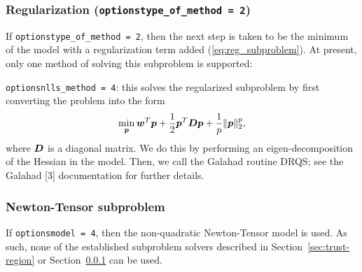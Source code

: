 \subsubsection{Regularization ({\tt options\ct type\_of\_method = 2})}
\label{sec:regularization}

If {\tt options\ct type\_of\_method = 2}, then the next step is taken to be the minimum
of the model with a regularization term added (\ref{eq:reg_subproblem}).  At present, 
only one method of solving this subproblem is supported:

\begin{description}
\item {\tt options\ct nlls\_method = 4}: this solves the regularized subproblem by first 
converting the problem into the form
$$\min_{\bm p} {\bm w}^T {\bm p} + \frac{1}{2} {\bm p}^T {\bm D} {\bm p} + \frac{1}{p}\|{\bm p}\|_2^p,$$
where ${\bm D}$ is a diagonal matrix.  We do this by performing an eigen-decomposition of 
the Hessian in the model.  Then, we call the {\sc Galahad} routine {\sc DRQS}; see 
the {\sc Galahad} [3] documentation for further details.
\end{description}

\subsubsection{Newton-Tensor subproblem}
\label{sec:newton_tensor_subproblem}

If {\tt options\ct model = 4}, then the non-quadratic Newton-Tensor model is used.  As such, none of the established subproblem solvers described in Section~\ref{sec:trust-region} or Section~\ref{sec:regularization} can be used.

